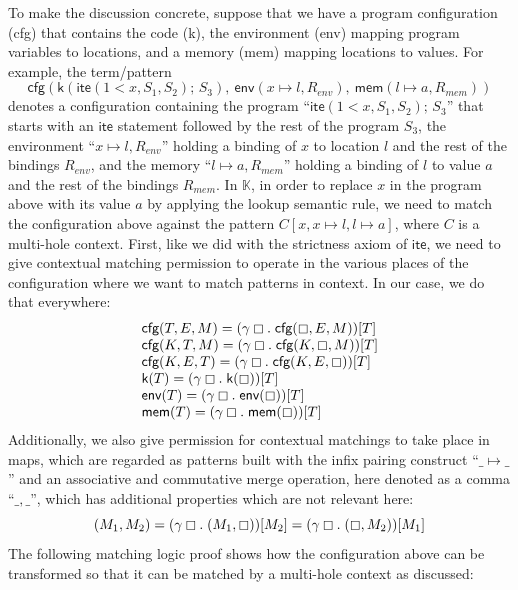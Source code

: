 \documentclass[UTF8,11pt]{article}
\theoremstyle{plain}
\theoremstyle{definition}
\theoremstyle{remark}
\newcommand{\K}{\mbox{$\mathbb{K}$}\xspace}
\newcommand{\hole}{\boxempty}
\newcommand{\ite}{\textsf{ite}}
\begin{document}
To make the discussion concrete, suppose that we have a program configuration
(\textsf{cfg}) that contains the code (\textsf{k}), the environment
(\textsf{env}) mapping program variables to locations,
and a memory (\textsf{mem}) mapping locations to values.
For example, the term/pattern
$$
\textsf{cfg}
(
\textsf{k}(\ite(1 < x,S_1,S_2)\textsf{;\ }S_3),
\ \textsf{env}(x \mapsto l, R_\textit{env})
,
\ \textsf{mem}(l \mapsto a, R_\textit{mem})
)
$$
denotes a configuration containing the program
``$\ite(1 < x,S_1,S_2)\textsf{;\ }S_3$''
that starts with an $\ite$ statement followed by the rest of the program $S_3$,
the environment ``$x \mapsto l, R_\textit{env}$'' holding a binding
of $x$ to location $l$ and the rest of the bindings $R_\textit{env}$,
and the memory ``$l \mapsto a, R_\textit{mem}$'' holding a binding
of $l$ to value $a$ and the rest of the bindings $R_\textit{mem}$.
In \K, in order to replace $x$ in the program above with its value $a$ by
applying the lookup semantic rule, we need to match the configuration above
against the pattern $C[x,x\mapsto l,l\mapsto a]$, where $C$ is a multi-hole
context.
First, like we did with the strictness axiom of $\ite$, we need to give
contextual matching permission to operate in the various places of the
configuration where we want to match patterns in context.
In our case, we do that everywhere:
$$
\begin{array}{l}
\textsf{cfg}(T,E,M) = (\gamma\hole.\;\textsf{cfg}(\hole,E,M))[T]
\\
\textsf{cfg}(K,T,M) = (\gamma\hole.\;\textsf{cfg}(K,\hole,M))[T]
\\
\textsf{cfg}(K,E,T) = (\gamma\hole.\;\textsf{cfg}(K,E,\hole))[T]
\\
\textsf{k}(T) = (\gamma\hole.\;\textsf{k}(\hole))[T]
\\
\textsf{env}(T) = (\gamma\hole.\;\textsf{env}(\hole))[T]
\\
\textsf{mem}(T) = (\gamma\hole.\;\textsf{mem}(\hole))[T]
\end{array}
$$
Additionally, we also give permission for contextual matchings to
take place in maps, which are regarded as patterns built with
the infix pairing construct ``$\_\mapsto\_$'' and an associative and
commutative merge operation, here denoted as a comma ``$\_,\_$'', which
has additional properties which are not relevant here:
$$
(M_1,M_2) 
= (\gamma\hole.\;(M_1,\hole))[M_2]
= (\gamma\hole.\;(\hole,M_2))[M_1]
$$
The following matching logic proof shows how the configuration above
can be transformed so that it can be matched by a multi-hole context
as discussed:
\end{document}

